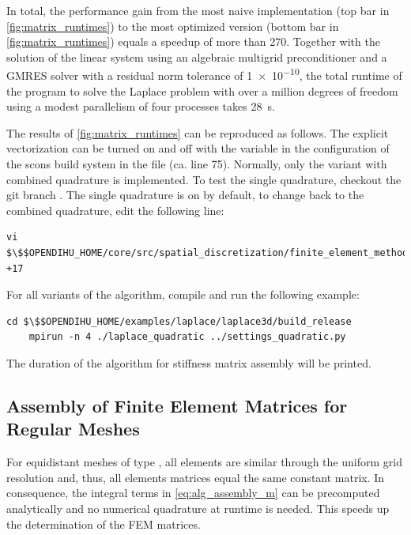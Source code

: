 In total, the performance gain from the most naive implementation (top bar in \cref{fig:matrix_runtimes}) to the most optimized version (bottom bar in \cref{fig:matrix_runtimes}) equals a speedup of more than \num{270}. Together with the solution of the linear system using an algebraic multigrid preconditioner and a GMRES solver with a residual norm tolerance of \num{1e-10}, the total runtime of the program to solve the Laplace problem with over a million degrees of freedom using a modest parallelism of four processes takes \SI{28}{\second}.


\begin{reproduce_no_break}
  The results of \cref{fig:matrix_runtimes} can be reproduced as follows. The explicit vectorization can be turned on and off with the variable  in the configuration of the scons build system in the file  (ca. line 75). Normally, only the variant with combined quadrature is implemented. To test the single quadrature, checkout the git branch . The single quadrature is on by default, to change back to the combined quadrature, edit the following line:
  \begin{lstlisting}[columns=fullflexible,breaklines=true,postbreak=\mbox{\textcolor{gray}{$\hookrightarrow$}\space}]
    vi $\$$OPENDIHU_HOME/core/src/spatial_discretization/finite_element_method/01_stiffness_matrix_integrate.tpp +17
  \end{lstlisting}
  For all variants of the algorithm, compile and run the following example: 
  \begin{lstlisting}[columns=fullflexible,breaklines=true,postbreak=\mbox{\textcolor{gray}{$\hookrightarrow$}\space}]
    cd $\$$OPENDIHU_HOME/examples/laplace/laplace3d/build_release
    mpirun -n 4 ./laplace_quadratic ../settings_quadratic.py
  \end{lstlisting}
  The duration of the algorithm for stiffness matrix assembly will be printed.
\end{reproduce_no_break}

\subsection{Assembly of Finite Element Matrices for Regular Meshes}

For equidistant meshes of type , all elements are similar through the uniform grid resolution and, thus, all elements matrices equal the same constant matrix. In consequence, the integral terms in \cref{eq:alg_assembly_m} can be precomputed analytically and no numerical quadrature at runtime is needed. This speeds up the determination of the FEM matrices.


